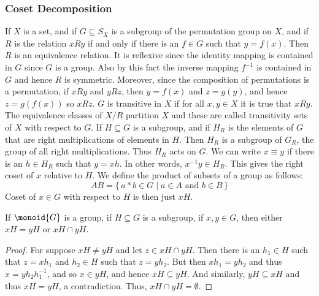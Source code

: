         \subsubsection{Coset Decomposition}
            If $X$ is a set, and if $G\subseteq{S}_{X}$ is a subgroup of the
            permutation group on $X$, and if $R$ is the relation
            $xRy$ if and only if there is an $f\in{G}$ such that
            $y=f(x)$. Then $R$ is an equivalence relation. It is reflexive
            since the identity mapping is contained in $G$ since $G$ is a
            group. Also by this fact the inverse mapping $f^{\minus{1}}$ is
            contained in $G$ and hence $R$ is symmetric. Moreover, since the
            composition of permutations is a permutation, if $xRy$ and
            $yRz$, then $y=f(x)$ and $z=g(y)$, and hence $z=g(f(x))$ so
            $xRz$. $G$ is transitive in $X$ if for all $x,y\in{X}$ it is
            true that $xRy$. The equivalence classes of $X/R$ partition $X$
            and these are called transitivity sets of $X$ with respect to
            $G$. If $H\subseteq{G}$ is a subgroup, and if $H_{R}$ is the
            elements of $G$ that are right multiplications of elements in
            $H$. Then $H_{R}$ is a subgroup of $G_{R}$, the group of all
            right multiplications. Thus $H_{R}$ acts on $G$. We can write
            $x\equiv{y}$ if there is an $h\in{H}_{R}$ such that $y=xh$. In
            other words, $x^{\minus{1}}y\in{H}_{R}$. This gives the right
            coset of $x$ relative to $H$. We define the product of subsets
            of a group as follows:
            \begin{equation}
                AB=\{\,a*b\in{G}\;|\;a\in{A}\textrm{ and }b\in{B}\,\}
            \end{equation}
            Coset of $x\in{G}$ with respect to $H$ is then just $xH$.
            \begin{theorem}
                If $\monoid{G}$ is a group, if $H\subseteq{G}$ is a
                subgroup, if $x,y\in{G}$, then either $xH=yH$ or
                $xH\cap{y}H$.
            \end{theorem}
            \begin{proof}
                For suppose $xH\ne{y}H$ and let $z\in{x}H\cap{y}H$. Then
                there is an $h_{1}\in{H}$ such that $z=xh_{1}$ and
                $h_{2}\in{H}$ such that $z=yh_{2}$. But then
                $xh_{1}=yh_{2}$ and thus $x=yh_{2}h_{1}^{\minus{1}}$, and
                so $x\in{y}H$, and hence $xH\subseteq{y}H$. And similarly,
                $yH\subseteq{x}H$ and thus $xH=yH$, a contradiction. Thus,
                $xH\cap{y}H=\emptyset$.
            \end{proof}
